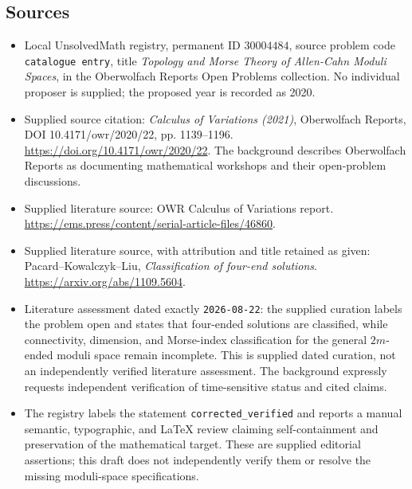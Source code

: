 \documentclass[11pt]{article}
\begin{document}
\subsection{Sources}
\begin{itemize}
\item Local UnsolvedMath registry, permanent ID \(30004484\), source problem code \texttt{catalogue entry}, title \emph{Topology and Morse Theory of Allen-Cahn Moduli Spaces}, in the Oberwolfach Reports Open Problems collection. No individual proposer is supplied; the proposed year is recorded as 2020.
\item Supplied source citation: \emph{Calculus of Variations (2021)}, Oberwolfach Reports, DOI 10.4171/owr/2020/22, pp. 1139--1196. \url{https://doi.org/10.4171/owr/2020/22}. The background describes Oberwolfach Reports as documenting mathematical workshops and their open-problem discussions.
\item Supplied literature source: OWR Calculus of Variations report. \url{https://ems.press/content/serial-article-files/46860}.
\item Supplied literature source, with attribution and title retained as given: Pacard--Kowalczyk--Liu, \emph{Classification of four-end solutions}. \url{https://arxiv.org/abs/1109.5604}.
\item Literature assessment dated exactly \texttt{2026-08-22}: the supplied curation labels the problem open and states that four-ended solutions are classified, while connectivity, dimension, and Morse-index classification for the general \(2m\)-ended moduli space remain incomplete. This is supplied dated curation, not an independently verified literature assessment. The background expressly requests independent verification of time-sensitive status and cited claims.
\item The registry labels the statement \texttt{corrected\_verified} and reports a manual semantic, typographic, and LaTeX review claiming self-containment and preservation of the mathematical target. These are supplied editorial assertions; this draft does not independently verify them or resolve the missing moduli-space specifications.
\end{itemize}
\end{document}
